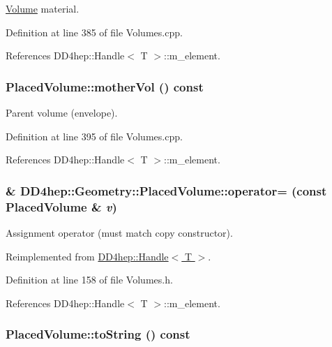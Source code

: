 \hyperlink{class_d_d4hep_1_1_geometry_1_1_volume}{Volume} material. 

Definition at line 385 of file Volumes.cpp.

References DD4hep::Handle$<$ T $>$::m\_\-element.\hypertarget{class_d_d4hep_1_1_geometry_1_1_placed_volume_add53ed67151813db86d2a26a8184d14d}{
\subsubsection[{motherVol}]{ PlacedVolume::motherVol () const}}
\label{class_d_d4hep_1_1_geometry_1_1_placed_volume_add53ed67151813db86d2a26a8184d14d}


Parent volume (envelope). 

Definition at line 395 of file Volumes.cpp.

References DD4hep::Handle$<$ T $>$::m\_\-element.\hypertarget{class_d_d4hep_1_1_geometry_1_1_placed_volume_a3bd4abac5c77adc45a1c66aff5ff4cb9}{
\subsubsection[{operator=}]{\& DD4hep::Geometry::PlacedVolume::operator= (const {\bf PlacedVolume} \& {\em v})}}
\label{class_d_d4hep_1_1_geometry_1_1_placed_volume_a3bd4abac5c77adc45a1c66aff5ff4cb9}


Assignment operator (must match copy constructor). 

Reimplemented from \hyperlink{class_d_d4hep_1_1_handle_a9bbf8f498df42e81ad26fb00233505a6}{DD4hep::Handle$<$ T $>$}.

Definition at line 158 of file Volumes.h.

References DD4hep::Handle$<$ T $>$::m\_\-element.\hypertarget{class_d_d4hep_1_1_geometry_1_1_placed_volume_a0eb030432fb329dcae65b2996c09324b}{
\subsubsection[{toString}]{ PlacedVolume::toString () const}}
\label{class_d_d4hep_1_1_geometry_1_1_placed_volume_a0eb030432fb329dcae65b2996c09324b}


